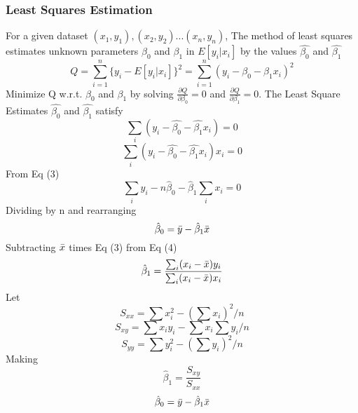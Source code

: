 \documentclass{article}
\begin{document}
\subsubsection{Least Squares Estimation}
For a given dataset $(x_{1},y_{1}),(x_{2},y_{2})...(x_{n},y_{n})$, The method of least squares estimates unknown parameters $\beta_{0}$ and $\beta_{1}$ in $E[y_{i}|x_{i}]$ by the values $\hat{\beta_{0}}$ and $\hat{\beta_{1}}$
$$Q = \sum_{i=1}^{n} \{ y_{i} - E[y_{i}|x_{i}]\}^{2} = \sum_{i=1}^{n}( y_{i} - \beta_{0} - \beta_{1}x_{i})^{2}$$
Minimize Q w.r.t. $\beta_{0}$ and $\beta_{1}$ by solving $\frac{\partial Q}{\partial \beta_{0}} = 0$ and $\frac{\partial Q}{\partial \beta_{1}} = 0$.
The Least Square Estimates $\hat{\beta_{0}}$ and $\hat{\beta_{1}}$ satisfy
\begin{equation}
    \sum_{i}(y_{i} - \hat{\beta_{0}} - \hat{\beta_{1}}x_{i}) = 0 
\end{equation}
\begin{equation}
    \sum_{i}(y_{i} - \hat{\beta_{0}} - \hat{\beta_{1}}x_{i})x_{i} = 0
\end{equation}
From Eq (3) 
\begin{equation*}
    \sum_{i} y_{i} - n\hat{\beta}_{0} - \hat{\beta}_{1}\sum_{i}x_{i} = 0
\end{equation*}
Dividing by n and rearranging
\begin{equation*}
    \hat{\beta}_{0} = \Bar{y} - \hat{\beta}_{1} \Bar{x}
\end{equation*}
Subtracting $\Bar{x}$ times Eq (3) from Eq (4)
\begin{equation*}
    \hat{\beta}_{1} = \frac{\sum_{i}(x_{i} - \Bar{x})y_{i}}{\sum_{i}(x_{i} - \Bar{x})x_{i}}
\end{equation*}
Let 
\begin{equation*}
    S_{xx} = \sum x_{i}^{2} - (\sum x_{i})^{2}/n
\end{equation*}
\begin{equation*}
    S_{xy} = \sum x_{i}y_{i} - \sum x_{i}\sum y_{i}/n
\end{equation*}
\begin{equation*}
    S_{yy} = \sum y_{i}^{2} - (\sum y_{i})^{2}/n
\end{equation*}
Making
\begin{equation}
    \hat{\beta}_{1} = \frac{S_{xy}}{S_{xx}} 
\end{equation}
\begin{equation}
    \hat{\beta}_{0} = \Bar{y} - \hat{\beta}_{1}\Bar{x}
\end{equation}
\end{document}
